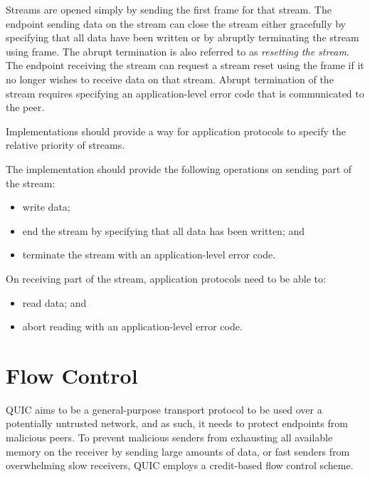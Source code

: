 
Streams are opened simply by sending the first \STREAM{} frame for that stream. The endpoint sending
data on the stream can close the stream either gracefully by specifying that all data have been
written or by abruptly terminating the stream using \RESETSTREAM{} frame. The abrupt termination is
also referred to as \textit{resetting the stream}. The endpoint receiving the stream can request a
stream reset using the \STOPSENDING{} frame if it no longer wishes to receive data on that stream.
Abrupt termination of the stream requires specifying an application-level error code that is
communicated to the peer.

Implementations should provide a way for application protocols to specify the relative priority of
streams.

The implementation should provide the following operations on sending part of the stream:

\begin{itemize}

  \item write data;

  \item end the stream by specifying that all data has been written; and

  \item terminate the stream with an application-level error code.

\end{itemize}

On receiving part of the stream, application protocols need to be able to:

\begin{itemize}

  \item read data; and

  \item abort reading with an application-level error code.

\end{itemize}

\section{Flow Control}

QUIC aims to be a general-purpose transport protocol to be used over a potentially untrusted
network, and as such, it needs to protect endpoints from malicious peers. To prevent malicious
senders from exhausting all available memory on the receiver by sending large amounts of data, or
fast senders from overwhelming slow receivers, QUIC employs a credit-based flow control scheme.

